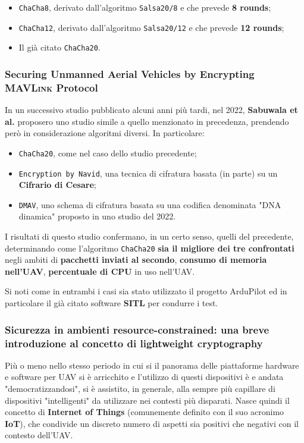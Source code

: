 \documentclass[a4paper, 12pt, oneside]{article}
\theoremstyle{definition}
\begin{document}
\begin{itemize}
    \item \texttt{ChaCha8}, derivato dall'algoritmo \texttt{Salsa20/8} e che prevede \textbf{8 rounds};
    \item \texttt{ChaCha12}, derivato dall'algoritmo \texttt{Salsa20/12} e che prevede \textbf{12 rounds};
    \item Il già citato \texttt{ChaCha20}.
\end{itemize}

\subsubsection{Securing Unmanned Aerial Vehicles by Encrypting \textsc{MAVLink} Protocol}

In un successivo studio \cite{10037546} pubblicato alcuni anni più tardi, nel 2022, \textbf{Sabuwala et al.} proposero uno studio simile a quello menzionato in precedenza, prendendo però in considerazione algoritmi diversi. In particolare:

\begin{itemize}
    \item \texttt{ChaCha20}, come nel caso dello studio precedente;
    \item \texttt{Encryption by Navid}, una tecnica di cifratura basata (in parte) su un \textbf{Cifrario di Cesare};
    \item \texttt{DMAV}, uno schema di cifratura basata su una codifica denominata "DNA dinamica" proposto in uno studio del 2022. 
\end{itemize}

I risultati di questo studio confermano, in un certo senso, quelli del precedente, determinando come l'algoritmo \texttt{ChaCha20} \textbf{sia il migliore dei tre confrontati} negli ambiti di \textbf{pacchetti inviati al secondo}, \textbf{consumo di memoria nell'UAV}, \textbf{percentuale di CPU} in uso nell'UAV.

Si noti come in entrambi i casi sia stato utilizzato il progetto ArduPilot ed in particolare il già citato software \textbf{SITL} per condurre i test.

\subsubsection{Sicurezza in ambienti resource-constrained: una breve introduzione al concetto di lightweight cryptography}
Più o meno nello stesso periodo in cui si il panorama delle piattaforme hardware e software per UAV si è arricchito e l'utilizzo di questi dispositivi è e andata "democratizzandosi", si è assistito, in generale, alla sempre più capillare di dispositivi "intelligenti" da utilizzare nei contesti più disparati. Nasce quindi il concetto di \textbf{Internet of Things} (comunemente definito con il suo acronimo \textbf{IoT}), che condivide un discreto numero di aspetti sia positivi che negativi con il contesto dell'UAV. 
\end{document}
